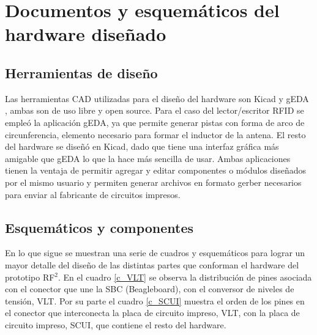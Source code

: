 \chapter{Documentos y esquemáticos del hardware diseñado}\label{docHW}

\section{Herramientas de diseño}
Las herramientas CAD utilizadas para el diseño del hardware son Kicad \cite{KiCad} y gEDA \cite{gEDA}, ambas son de uso libre y open source.
Para el caso del lector/escritor RFID se empleó la aplicación gEDA, ya que permite generar 
pistas con forma de arco de circunferencia, elemento necesario para formar el inductor de la antena. 
El resto del hardware se diseñó en Kicad, dado que tiene una interfaz gráfica más amigable que gEDA lo que la hace más sencilla de usar.
Ambas aplicaciones tienen la ventaja de permitir agregar y editar componentes
o módulos diseñados por el mismo usuario y permiten generar archivos en formato
gerber necesarios para enviar al fabricante de circuitos impresos.


\section{Esquemáticos y componentes}

En lo que sigue se muestran una serie de cuadros y esquemáticos para lograr un 
mayor detalle del diseño de las distintas partes que conforman el hardware
del prototipo RF$^{2}$.
En el cuadro \ref{c_VLT} se observa la distribución de pines asociada con el conector
que une la SBC (Beagleboard), con el conversor de niveles de tensión, VLT.
Por su parte el cuadro \ref{c_SCUI} muestra el orden de los pines en el conector que 
interconecta la placa de circuito impreso, VLT, con la placa de circuito
impreso, SCUI, que contiene el resto del hardware. 


